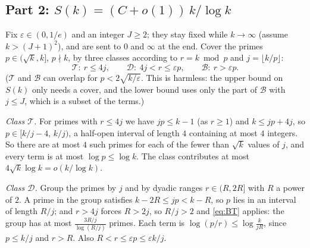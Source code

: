 \documentclass[11pt]{amsart}
\theoremstyle{remark}
\begin{document}
\subsection*{Part 2: \texorpdfstring{$S(k)=(C+o(1))\,k/\log k$}{S(k) = (C+o(1)) k/log k}}

Fix $\varepsilon\in(0,1/e)$ and an integer $J\ge2$; they stay fixed while $k\to\infty$ (assume $k>(J+1)^2$), and are sent to $0$ and $\infty$ at the end. Cover the primes $p\in(\sqrt k,k]$, $p\nmid k$, by three classes according to $r=k\bmod p$ and $j=\lfloor k/p\rfloor$:
\[\mathcal T:\ r\le4j,\qquad\mathcal D:\ 4j<r\le\varepsilon p,\qquad\mathcal B:\ r>\varepsilon p.\]
($\mathcal T$ and $\mathcal B$ can overlap for $p<2\sqrt{k/\varepsilon}$. This is harmless: the upper bound on $S(k)$ only needs a cover, and the lower bound uses only the part of $\mathcal B$ with $j\le J$, which is a subset of the terms.)

\emph{Class $\mathcal T$.} For primes with $r\le4j$ we have $jp\le k-1$ (as $r\ge1$) and $k\le jp+4j$, so $p\in[k/j-4,\,k/j)$, a half-open interval of length $4$ containing at most $4$ integers. So there are at most $4$ such primes for each of the fewer than $\sqrt k$ values of $j$, and every term is at most $\log p\le\log k$. The class contributes at most $4\sqrt k\log k=o(k/\log k)$.

\emph{Class $\mathcal D$.} Group the primes by $j$ and by dyadic ranges $r\in(R,2R]$ with $R$ a power of $2$. A prime in the group satisfies $k-2R\le jp<k-R$, so $p$ lies in an interval of length $R/j$; and $r>4j$ forces $R>2j$, so $R/j>2$ and \eqref{eq:BT} applies: the group has at most $\frac{3R/j}{\log(R/j)}$ primes. Each term is $\log(p/r)\le\log\frac{k}{jR}$, since $p\le k/j$ and $r>R$. Also $R<r\le\varepsilon p\le\varepsilon k/j$.
\end{document}
